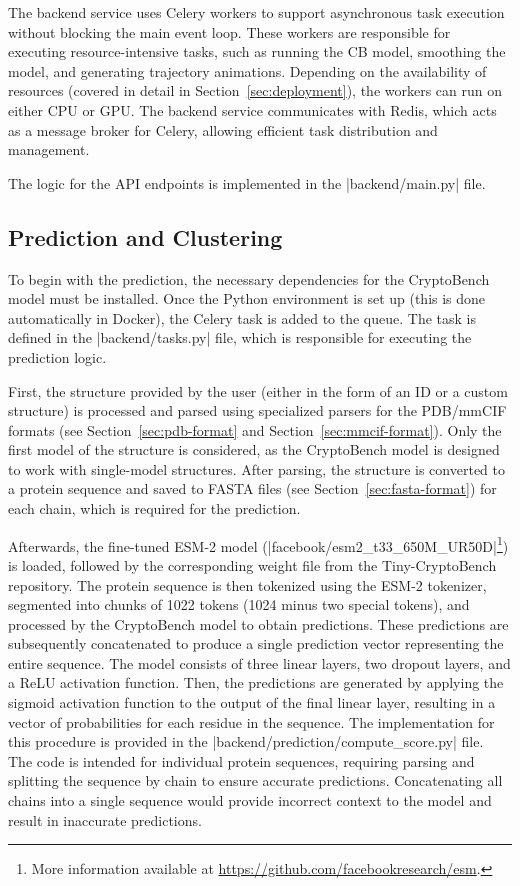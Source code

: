 The backend service uses Celery workers to support asynchronous task execution without blocking the main event loop. These workers are responsible for executing resource-intensive tasks, such as running the CB model, smoothing the model, and generating trajectory animations. Depending on the availability of resources (covered in detail in Section~\ref{sec:deployment}), the workers can run on either CPU or GPU. The backend service communicates with Redis, which acts as a message broker for Celery, allowing efficient task distribution and management.

The logic for the API endpoints is implemented in the \inline|backend/main.py| file.

\subsection{Prediction and Clustering}
\label{sec:prediction-backend}

To begin with the prediction, the necessary dependencies for the CryptoBench model must be installed. Once the Python environment is set up (this is done automatically in Docker), the Celery task is added to the queue. The task is defined in the \inline|backend/tasks.py| file, which is responsible for executing the prediction logic.

First, the structure provided by the user (either in the form of an ID or a custom structure) is processed and parsed using specialized parsers for the PDB/mmCIF formats (see Section~\ref{sec:pdb-format} and Section~\ref{sec:mmcif-format}). Only the first model of the structure is considered, as the CryptoBench model is designed to work with single-model structures. After parsing, the structure is converted to a protein sequence and saved to FASTA files (see Section~\ref{sec:fasta-format}) for each chain, which is required for the prediction.

Afterwards, the fine-tuned ESM-2 model (\inline|facebook/esm2_t33_650M_UR50D|\footnote{More information available at \url{https://github.com/facebookresearch/esm}.}) is loaded, followed by the corresponding weight file from the Tiny-CryptoBench repository. The protein sequence is then tokenized using the ESM-2 tokenizer, segmented into chunks of 1022 tokens (1024 minus two special tokens), and processed by the CryptoBench model to obtain predictions. These predictions are subsequently concatenated to produce a single prediction vector representing the entire sequence. The model consists of three linear layers, two dropout layers, and a ReLU activation function. Then, the predictions are generated by applying the sigmoid activation function to the output of the final linear layer, resulting in a vector of probabilities for each residue in the sequence. The implementation for this procedure is provided in the \inline|backend/prediction/compute_score.py| file. The code is intended for individual protein sequences, requiring parsing and splitting the sequence by chain to ensure accurate predictions. Concatenating all chains into a single sequence would provide incorrect context to the model and result in inaccurate predictions.

